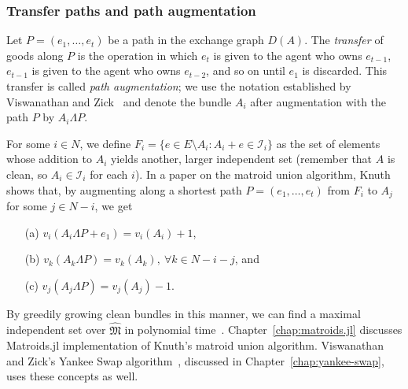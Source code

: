 \subsubsection*{Transfer paths and path augmentation}
Let $P = (e_1, \dots, e_t)$ be a path in the exchange graph $D(A)$. The \textit{transfer} of goods along $P$ is the operation in which $e_t$ is given to the agent who owns $e_{t-1}$, $e_{t-1}$ is given to the agent who owns $e_{t-2}$, and so on until $e_1$ is discarded. This transfer is called \textit{path augmentation}; we use the notation established by Viswanathan and Zick~\cite{viswanathan2023yankee} and denote the bundle $A_i$ after augmentation with the path $P$ by $A_i \Lambda P$. 

For some $i\in N$, we define $F_i = \{ e\in E\setminus A_i : A_i + e \in \mathcal{I}_i \}$ as the set of elements whose addition to $A_i$ yields another, larger independent set (remember that $A$ is clean, so $A_i\in\mathcal{I}_i$ for each $i$). In a paper on the matroid union algorithm, Knuth~\cite{knuth1973matroidpartitioning} shows that, by augmenting along a shortest path $P = (e_1,\dots,e_t)$ from $F_i$ to $A_j$ for some $j \in N - i$, we get
\begin{enumerate}
  \item[(a)] $v_i(A_i\Lambda P + e_1) = v_i(A_i) + 1$,
  \item[(b)] $v_k(A_k\Lambda P) = v_k(A_k),\ \forall k\in N - i - j$, and
  \item[(c)] $v_j(A_j\Lambda P) = v_j(A_j) - 1$.
\end{enumerate}
By greedily growing clean bundles in this manner, we can find a maximal independent set over $\widehat{\mathfrak{M}}$ in polynomial time~\cite{schrijver-2003}. Chapter~\ref{chap:matroids.jl} discusses Matroids.jl implementation of Knuth's matroid union algorithm. Viswanathan and Zick's Yankee Swap algorithm~\cite{viswanathan2023yankee}, discussed in Chapter~\ref{chap:yankee-swap}, uses these concepts as well.

